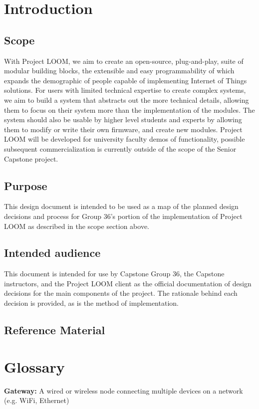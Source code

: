 \documentclass[onecolumn, draftclsnofoot,10pt, compsoc]{IEEEtran}
\begin{document}
\section{Introduction}
\subsection{Scope}  
    With Project LOOM, we aim to create an open-source, plug-and-play, suite of modular building blocks, the extensible and easy programmability of which expands the demographic of people capable of implementing Internet of Things solutions. For users with limited technical expertise to create complex systems, we aim to build a system that abstracts out the more technical details, allowing them to focus on their system more than the implementation of the modules. The system should also be usable by higher level students and experts by allowing them to modify or write their own firmware, and create new modules. Project LOOM will be developed for university faculty demos of functionality, possible subsequent commercialization is currently outside of the scope of the Senior Capstone project.

\subsection{Purpose}
    This design document is intended to be used as a map of the planned design decisions and process for Group 36's portion of the implementation of Project LOOM as described in the scope section above.
                
\subsection{Intended audience}
    This document is intended for use by Capstone Group 36, the Capstone instructors, and the Project LOOM client as the official documentation of design decisions for the main components of the project. The rationale behind each decision is provided, as is the method of implementation.

\subsection{Reference Material}
    \renewcommand{\listfigurename}{}
    \vspace{-40pt}
    \listoffigures

\section{Glossary}
    \textbf{Gateway:} A wired or wireless node connecting multiple devices on a network (e.g. WiFi, Ethernet)
\end{document}
